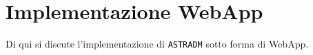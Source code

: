 \section{Implementazione WebApp}
Di qui si discute l'implementazione di \texttt{ASTRADM} sotto forma
di WebApp.




